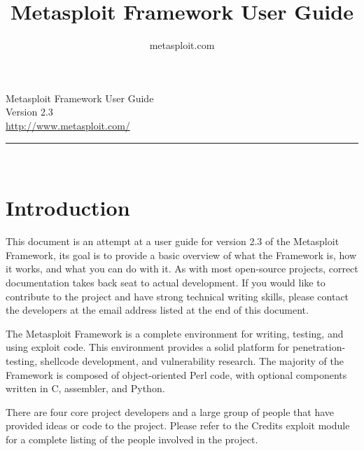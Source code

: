 \documentclass{report}
\begin{document}
\title{Metasploit Framework User Guide}
\author{metasploit.com}

\begin{titlepage}
    \begin{center}
        		

        \huge{Metasploit Framework User Guide}
		\ \\[10mm]
		\large{Version 2.3}
		\\[120mm]
		
        \small{\url{http://www.metasploit.com/}}

        \rule{10cm}{1pt} \\[4mm]
        \renewcommand{\arraystretch}{0.5}
    \end{center}
\end{titlepage}

\tableofcontents

\setlength{\parindent}{0pt} \setlength{\parskip}{8pt}



\chapter{Introduction}

\par
This document is an attempt at a user guide for version 2.3 of the Metasploit
Framework, its goal is to provide a basic overview of what the Framework is, how
it works, and what you can do with it. As with most open-source projects,
correct documentation takes back seat to actual development. If you would like
to contribute to the project and have strong technical writing skills, please
contact the developers at the email address listed at the end of this document. 

\par
The Metasploit Framework is a complete environment for writing, testing, and
using exploit code. This environment provides a solid platform for
penetration-testing, shellcode development, and vulnerability research. The
majority of the Framework is composed of object-oriented Perl code, with
optional components written in C, assembler, and Python.  

\par
There are four core project developers and a large group of people that have
provided ideas or code to the project. Please refer to the Credits exploit
module for a complete listing of the people involved in the project. 
\end{document}
